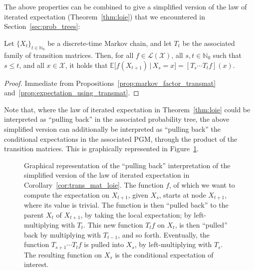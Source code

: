 \documentclass[graybox]{svmult}
\newcommand{\nats}{\mathbb{N}}
\newcommand{\natswith}{\nats_{0}}
\newcommand{\states}{\mathcal{X}}
\newcommand{\gambles}{\mathcal{L}}
\newcommand{\gamblesX}{\gambles(\states)}
\begin{document}
The above properties can be combined to give a simplified version of the law of iterated expectation (Theorem~\ref{thm:loie}) that we encountered in Section~\ref{sec:prob_trees}:
\begin{corollary}\label{cor:trans_mat_loie}
Let $\{X_t\}_{t\in\natswith}$ be a discrete-time Markov chain, and let $T_t$ be the associated family of transition matrices. Then, for all $f\in\gamblesX$, all $s,t\in\natswith$ such that $s\leq t$, and all $x\in\states$, it holds that $\mathbb{E}\bigl[f(X_{t+1})\,\vert\,X_s=x\bigr] = \left[T_s\cdots T_tf\right](x)$.
\end{corollary}
\begin{proof}
Immediate from Propositions~\ref{prop:markov_factor_transmat} and~\ref{prop:expectation_using_transmat}.
\end{proof}
Note that, where the law of iterated expectation in Theorem~\ref{thm:loie} could be interpreted as ``pulling back'' in the associated probability tree, the above simplified version can additionally be interpreted as ``pulling back'' the conditional expectations in the associated PGM, through the product of the transition matrices. This is graphically represented in Figure~\ref{fig:example_loie_pgm}.
\begin{figure}
\centering
{}
\caption{Graphical representation of the ``pulling back'' interpretation of the simplified version of the law of iterated expectation in Corollary~\ref{cor:trans_mat_loie}. The function $f$, of which we want to compute the expectation on $X_{t+1}$, given $X_s$, starts at node $X_{t+1}$, where its value is trivial. The function is then ``pulled back'' to the parent $X_t$ of $X_{t+1}$, by taking the local expectation;  by left-multiplying with $T_t$. This new function $T_tf$ on $X_t$, is then ``pulled'' back by multiplying with $T_{t-1}$, and so forth. Eventually, the function $T_{s+1}\cdots T_tf$ is pulled into $X_s$, by left-multiplying with $T_s$. The resulting function on $X_s$ is the conditional expectation of interest.}
\label{fig:example_loie_pgm}
\end{figure}
\end{document}
